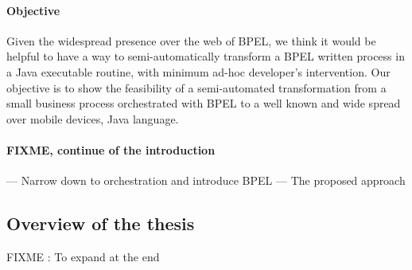 \paragraph{Objective}
 

Given the widespread presence over the web of BPEL, we think it would be helpful to have a way to semi-automatically transform a BPEL written process in a Java executable routine, with minimum ad-hoc developer's intervention.
Our objective is to show the feasibility of a semi-automated transformation from a small business process orchestrated with BPEL to a well known and wide spread over mobile devices, Java language. 

\paragraph{FIXME, continue of the introduction}
--- Narrow down to orchestration and introduce BPEL 
--- The proposed approach 




\subsection{Overview of the thesis}
FIXME : To expand at the end


